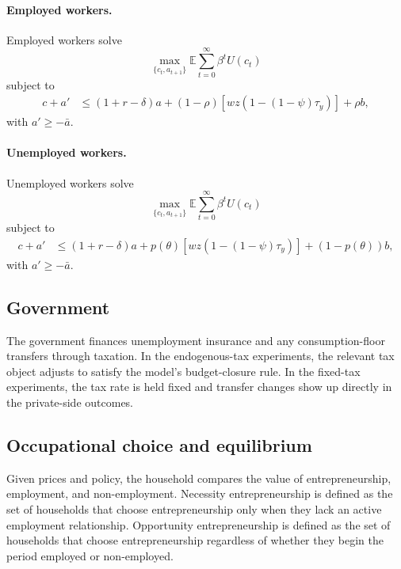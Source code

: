 \paragraph{Employed workers.}

Employed workers solve
\begin{equation}
    \max_{\{c_t, a_{t+1}\}}
    \mathbb{E}\sum_{t=0}^{\infty}\beta^t U(c_t)
\end{equation}
subject to
\begin{align}
    c + a'
    &\leq
    (1+r-\delta)a
    + (1-\rho)\left[wz(1-(1-\psi)\tau_y)\right]
    + \rho b,
    \label{eq:budget_employed_self_employment}
\end{align}
with $a' \geq -\bar{a}$.

\paragraph{Unemployed workers.}

Unemployed workers solve
\begin{equation}
    \max_{\{c_t, a_{t+1}\}}
    \mathbb{E}\sum_{t=0}^{\infty}\beta^t U(c_t)
\end{equation}
subject to
\begin{align}
    c + a'
    &\leq
    (1+r-\delta)a
    + p(\theta)\left[wz(1-(1-\psi)\tau_y)\right]
    + (1-p(\theta))b,
    \label{eq:budget_unemployed_self_employment}
\end{align}
with $a' \geq -\bar{a}$.

\subsection{Government}

The government finances unemployment insurance and any consumption-floor
transfers through taxation. In the endogenous-tax experiments, the relevant tax
object adjusts to satisfy the model's budget-closure rule. In the fixed-tax
experiments, the tax rate is held fixed and transfer changes show up directly in
the private-side outcomes.

\subsection{Occupational choice and equilibrium}

Given prices and policy, the household compares the value of entrepreneurship,
employment, and non-employment. Necessity entrepreneurship is defined as the
set of households that choose entrepreneurship only when they lack an active
employment relationship. Opportunity entrepreneurship is defined as the set of
households that choose entrepreneurship regardless of whether they begin the
period employed or non-employed.


